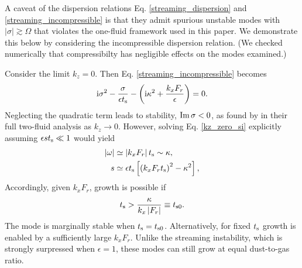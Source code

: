 A caveat of the dispersion relations 
Eq. \ref{streaming_dispersion} and \ref{streaming_incompressible} is
that they admit spurious unstable modes with $|\sigma|\gtrsim \Omega$
that violates the one-fluid framework used in this
paper. We demonstrate this below by considering the
incompressible dispersion relation. (We checked numerically that
compressibilty has negligible effects on the modes examined.) 

Consider the limit $k_z=0$. Then Eq. \ref{streaming_incompressible}
becomes 
\begin{align}      %
\ii \sigma^2 - \frac{\sigma}{\epsilon \tstop}  - \left(\ii \kappa^2 +
  \frac{k_xF_r}{\epsilon}\right) = 0. \label{kz_zero_si}
\end{align} 
Neglecting the quadratic term leads to stability, $\operatorname{Im}{\sigma}<0$, 
as found by \cite{youdin05a} in their full two-fluid analysis as 
$k_z\to0$.  
However, solving Eq. \ref{kz_zero_si} explicitly assuming $\epsilon s t_\mathrm{s} \ll 1$ would yield 
\begin{align}
  |\omega| &\simeq \left|k_xF_r\right| t_\mathrm{s} \sim \kappa, \\
  s &\simeq \epsilon t_\mathrm{s} \left[\left(k_xF_rt_\mathrm{s}\right)^2 - \kappa^2\right],\label{epi_grow}
\end{align}
Accordingly, given $k_xF_r$, growth is possible if 
\begin{align}
t_\mathrm{s} > \frac{\kappa}{k_x\left|F_r\right|}\equiv t_{\mathrm{s}0}.\label{epi_grow_criterion}
\end{align}
The mode is marginally stable when $t_\mathrm{s} =
t_{\mathrm{s}0}$. Alternatively, for fixed $t_\mathrm{s}$ growth is enabled
by a sufficiently large $k_xF_r$. Unlike the streaming instability,
which is strongly surpressed when $\epsilon=1$, these modes can still
grow at equal dust-to-gas ratio.  

